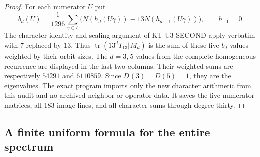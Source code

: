 \documentclass[11pt,a4paper]{article}
\theoremstyle{definition}
\begin{document}
\begin{proof}
For each numerator $U$ put
\[
 b_d(U)=\frac1{1296}\sum_{\gamma\in\Gamma}
       \bigl(N(h_d(U\gamma))-13N(h_{d-1}(U\gamma))\bigr),
 \qquad h_{-1}=0.
\]
The character identity and scaling argument of KT-U3-SECOND
apply verbatim with $7$ replaced by $13$. Thus
$\operatorname{tr}(13^dT_{13}|M_d)$ is the sum of these five
$b_d$ values weighted by their orbit sizes. The $d=3,5$ values
from the complete-homogeneous recurrence are displayed in the
last two columns. Their weighted sums are respectively $54291$
and $6110859$. Since $D(3)=D(5)=1$, they are the eigenvalues.
The exact program  imports only
the new character arithmetic from this audit and no archived
neighbor or operator data. It saves the five numerator matrices,
all 183 image lines, and all character sums through degree thirty.
\end{proof}

\subsection{A finite uniform formula for the entire spectrum}
\end{document}
